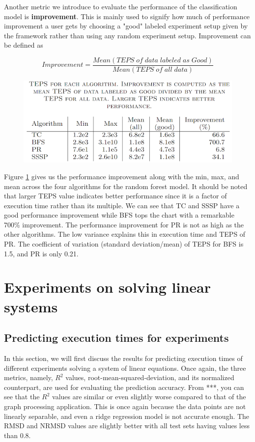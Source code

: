 Another metric we introduce to evaluate the performance of the classification model is \textbf{improvement}. This is mainly used to signify how much of performance improvement a user gets by choosing a "good" labeled experiment setup given by the framework rather than using any random experiment setup. Improvement can be defined as


\[
Improvement=  \frac{Mean(TEPS\;of\;data\;labeled\;as\;Good)}{Mean(TEPS\;of\;all\;data)}
\]
\vspace{4 pt}


\begin{figure}
    \centering
    \includegraphics[width=1\columnwidth]{figures/classification_improvement.png}
    \caption{}
    \label{Improvement}
\end{figure}

Figure \ref{Improvement} gives us the performance improvement along with the min, max, and mean across the four algorithms for the random forest model. It should be noted that larger TEPS value indicates better performance since it is a factor of execution time rather than its multiple. We can see that TC and SSSP have a good performance improvement while BFS tops the chart with a remarkable 700\% improvement. The performance improvement for PR is not as high as the other algorithms. The low variance explains this in execution time and TEPS of PR. The coefficient of variation (standard deviation/mean) of TEPS for BFS is 1.5, and PR is only 0.21. 

\section{Experiments on solving linear systems}

\subsection{Predicting execution times for experiments}
In this section, we will first discuss the results for predicting execution times of different experiments solving a system of linear equations. Once again, the three metrics, namely, $R^2$ values, root-mean-squared-deviation, and its normalized counterpart, are used for evaluating the prediction accuracy. From ***, you can see that the $R^2$ values are similar or even slightly worse compared to that of the graph processing application. This is once again because the data points are not linearly separable, and even a ridge regression model is not accurate enough. The RMSD and NRMSD values are slightly better with all test sets having values less than 0.8. 

